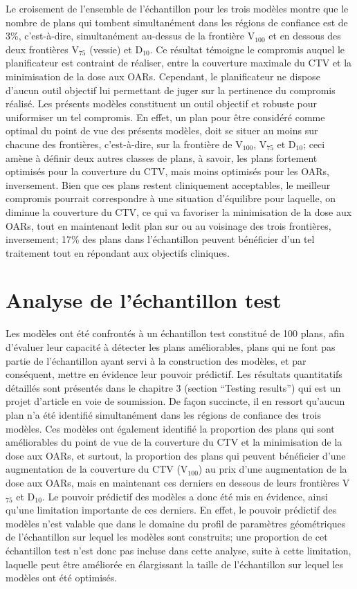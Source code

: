 %
Le croisement de l'ensemble de l’échantillon pour les trois modèles montre que le nombre de plans qui tombent simultanément dans les régions de confiance est de 3\%, c’est-à-dire, simultanément au-dessus de la frontière V$_{100}$ et en dessous des deux frontières V$_{75}$ (vessie) et D$_{10}$. Ce résultat témoigne le compromis auquel le planificateur est contraint de réaliser, entre la couverture maximale du CTV et la minimisation de la dose aux OARs. Cependant, le planificateur ne dispose d’aucun outil objectif lui permettant de juger sur la pertinence du compromis réalisé. Les présents modèles constituent un outil objectif et robuste pour uniformiser un tel compromis. En effet, un plan pour être considéré comme optimal du point de vue des présents modèles, doit se situer au moins sur chacune des frontières, c’est-à-dire, sur la frontière de V$_{100}$, V$_{75}$ et D$_{10}$; ceci amène à définir deux autres classes de plans, à savoir, les plans fortement optimisés pour la couverture du CTV, mais moins optimisés pour les OARs, inversement. Bien que ces plans restent cliniquement acceptables, le meilleur compromis pourrait correspondre à une situation d’équilibre pour laquelle, on diminue la couverture du CTV, ce qui va favoriser la minimisation de la dose aux OARs, tout en maintenant ledit plan sur ou au voisinage des trois frontières, inversement; 17\% des plans dans l’échantillon peuvent bénéficier d’un tel traitement tout en répondant aux objectifs cliniques.
%
\section{Analyse de l'échantillon test} \label{subsec:Echantest}
Les modèles ont été confrontés à un échantillon test constitué de 100 plans, afin d’évaluer leur capacité à détecter les plans améliorables, plans qui ne font pas partie de l’échantillon ayant servi à la construction des modèles, et par conséquent, mettre en évidence leur pouvoir prédictif. Les résultats quantitatifs détaillés sont présentés dans le chapitre 3 (section \enquote{Testing results}) qui est un projet d’article en voie de soumission. De façon succincte,  il en ressort qu’aucun plan n’a été identifié simultanément dans les régions de confiance des trois modèles. Ces modèles ont également identifié la proportion des plans qui sont améliorables du point de vue de la couverture du CTV et la minimisation de la dose aux OARs, et surtout, la proportion des plans qui peuvent bénéficier d’une augmentation de la couverture du CTV (V$_{100}$) au prix d’une augmentation de la dose aux OARs, mais en maintenant ces derniers en dessous de leurs frontières V$_{75}$ et D$_{10}$. Le pouvoir prédictif des modèles a donc été mis en évidence, ainsi qu’une limitation importante de ces derniers. En effet, le pouvoir prédictif des modèles n’est valable que dans le domaine du profil de paramètres géométriques de l’échantillon sur lequel les modèles sont construits; une proportion de cet échantillon test n’est donc pas incluse dans cette analyse, suite à cette limitation, laquelle peut être améliorée en élargissant la taille de l'échantillon sur lequel les modèles ont été optimisés. 
%
